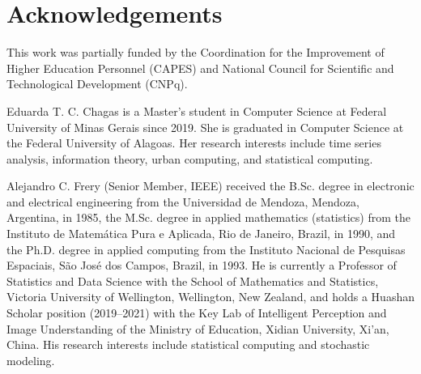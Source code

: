 \documentclass[journal]{IEEEtran}
\begin{document}



\section*{Acknowledgements}\label{ACKNOWLEDGEMENTS}

This work was partially funded by the Coordination for the Improvement of Higher Education Personnel (CAPES) and National Council for Scientific and Technological Development (CNPq).

\begin{IEEEbiography}{Eduarda T. C. Chagas} is a Master's student in Computer Science at Federal University of Minas Gerais since 2019. 
She is graduated in Computer Science at the Federal University of Alagoas. 
Her research interests include time series analysis, information theory, urban computing, and statistical computing.
\end{IEEEbiography}

\begin{IEEEbiography} {Alejandro C. Frery} (Senior Member, IEEE) received the B.Sc. degree in electronic and electrical engineering from the Universidad de Mendoza, Mendoza, Argentina, in 1985, the M.Sc. degree in applied mathematics (statistics) from the Instituto de Matemática Pura e Aplicada, Rio de Janeiro, Brazil, in 1990, and the Ph.D. degree in applied computing from the Instituto Nacional de Pesquisas Espaciais, São José dos Campos, Brazil, in 1993.
He is currently a Professor of Statistics and Data Science with the School of Mathematics and Statistics, Victoria University of Wellington, Wellington, New Zealand, and holds a Huashan Scholar position (2019–2021) with the Key Lab of Intelligent Perception and Image Understanding of the Ministry of Education, Xidian University, Xi’an, China. His research interests include statistical computing and stochastic modeling.
\end{IEEEbiography}
\end{document}
